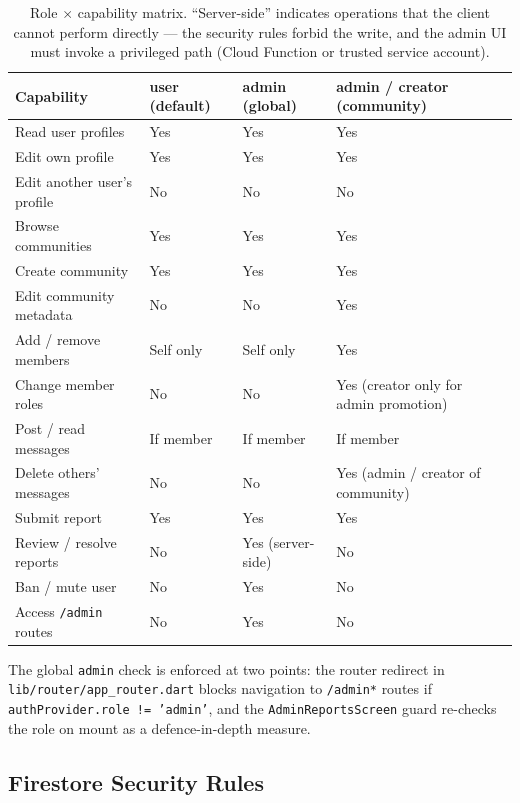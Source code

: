 \documentclass[11pt,a4paper]{article}
\renewcommand{\arraystretch}{1.05}
\begin{document}
\begin{table}[h]
\centering\small
\renewcommand{\arraystretch}{1.15}
\begin{tabularx}{\linewidth}{@{}lXXX@{}}
\toprule
\textbf{Capability} & \textbf{user (default)} & \textbf{admin (global)} & \textbf{admin / creator (community)} \\
\midrule
Read user profiles                 & Yes & Yes & Yes \\
Edit own profile                   & Yes & Yes & Yes \\
Edit another user's profile        & No  & No  & No \\
Browse communities                 & Yes & Yes & Yes \\
Create community                   & Yes & Yes & Yes \\
Edit community metadata            & No  & No  & Yes \\
Add / remove members               & Self only & Self only & Yes \\
Change member roles                & No  & No  & Yes (creator only for admin promotion) \\
Post / read messages               & If member & If member & If member \\
Delete others' messages            & No  & No  & Yes (admin / creator of community) \\
Submit report                      & Yes & Yes & Yes \\
Review / resolve reports           & No  & Yes (server-side) & No \\
Ban / mute user                    & No  & Yes & No \\
Access \texttt{/admin} routes      & No  & Yes & No \\
\bottomrule
\end{tabularx}
\caption{Role $\times$ capability matrix. ``Server-side'' indicates
operations that the client cannot perform directly --- the security rules
forbid the write, and the admin UI must invoke a privileged path (Cloud
Function or trusted service account).}
\end{table}

The global \texttt{admin} check is enforced at two points: the router
redirect in \texttt{lib/router/app\_router.dart} blocks navigation to
\texttt{/admin*} routes if \texttt{authProvider.role != 'admin'}, and the
\texttt{AdminReportsScreen} guard re-checks the role on mount as a
defence-in-depth measure.

\subsection{Firestore Security Rules}
\end{document}
